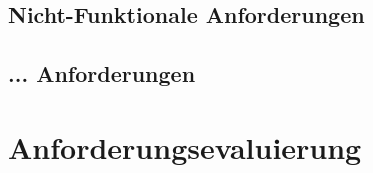 \subsection{Nicht-Funktionale Anforderungen}
\label{subsec:requirements:classification:nonfunctional}
\lipsum[1-1]

\subsection{... Anforderungen}
\label{subsec:requirements:classification:other}
\lipsum[1-1]

%
%
\section{Anforderungsevaluierung}
\label{sec:requirements:evaluation}
\lipsum[1-1]
